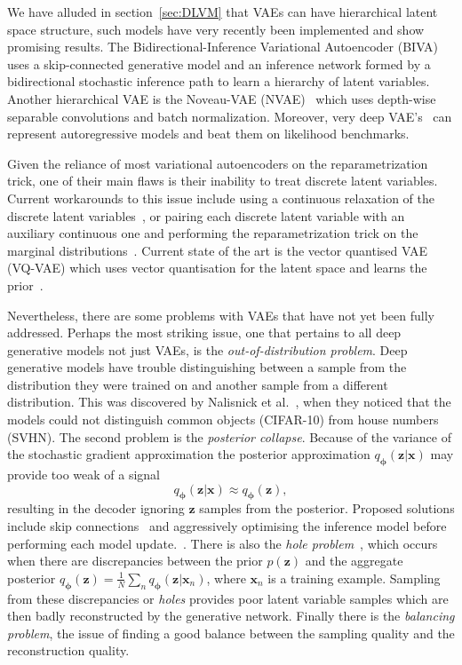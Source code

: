 \documentclass[final,3p,times,twocolumn]{elsarticle}
\begin{document}
We have alluded in section~\ref{sec:DLVM} that VAEs can have hierarchical latent space structure, such models have very recently been implemented and show promising results. The Bidirectional-Inference Variational Autoencoder (BIVA)~\cite{maaloe2019biva} uses a skip-connected generative model and an inference network formed by a bidirectional stochastic inference path to learn a hierarchy of latent variables. Another hierarchical VAE is the Noveau-VAE (NVAE)~\cite{vahdat2020nvae} which uses depth-wise separable convolutions and batch normalization. Moreover, very deep VAE's~\cite{child2020very} can represent autoregressive models and beat them on likelihood benchmarks. 

Given the reliance of most variational autoencoders on the reparametrization trick, one of their main flaws is their inability to treat discrete latent variables. Current workarounds to this issue include using a continuous relaxation of the discrete latent variables~\cite{maddison2016discrelax}, or pairing each discrete latent variable with an auxiliary continuous one and performing the reparametrization trick on the marginal distributions~\cite{rolfe2016discrete}. Current state of the art is the vector quantised VAE (VQ-VAE) which uses vector quantisation for the latent space and learns the prior~\cite{DBLP:journals/corr/abs-1711-00937}.

Nevertheless, there are some problems with VAEs that have not yet been fully addressed. Perhaps the most striking issue, one that pertains to all deep generative models not just VAEs, is the \emph{out-of-distribution problem}. Deep generative models have trouble distinguishing between a sample from the distribution they were trained on and another sample from a different distribution. This was discovered by Nalisnick et al.~\cite{nalisnick2018deep}, when they noticed that the models could not distinguish common objects (CIFAR-10) from house numbers (SVHN). The second problem is the \emph{posterior collapse}. Because of the variance of the stochastic gradient approximation the posterior approximation $q_{\boldsymbol{\phi}}(\mathbf{z} | \mathbf{x})$ may provide too weak of a signal 
\begin{equation}
	q_{\boldsymbol{\phi}}(\mathbf{z} | \mathbf{x}) \approx q_{\boldsymbol{\phi}}(\mathbf{z}),
\end{equation}
resulting in the decoder ignoring $\mathbf{z}$ samples from the posterior. Proposed solutions include skip connections~\cite{dieng2016variational} and aggressively optimising the inference model before performing each model update.~\cite{he2019lagging}. There is also the \emph{hole problem}~\cite{rezende2018taming}, which occurs when there are discrepancies between the prior $p(\mathbf{z})$ and the aggregate posterior $q_{\boldsymbol{\phi}}(\mathbf{z}) =  \frac{1}{N} \sum_{n} q_{\boldsymbol{\phi}}\left(\mathbf{z}| \mathbf{x}_{n}\right)$, where $\mathbf{x}_n$ is a training example. Sampling from these discrepancies or \emph{holes} provides poor latent variable samples which are then badly reconstructed by the generative network. Finally there is the \emph{balancing problem}, the issue of finding a good balance between the sampling quality and the reconstruction quality.
\end{document}
